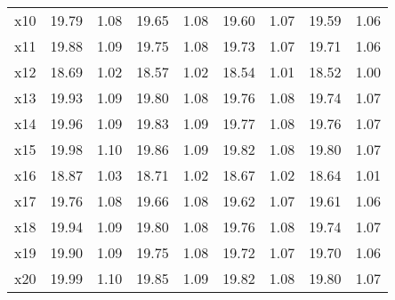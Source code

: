 \begin{tabular}{lcccccccc}
x10 & 19.79 & 1.08 & 19.65 & 1.08 & 19.60 & 1.07 & 19.59 & 1.06\\
x11 & 19.88 & 1.09 & 19.75 & 1.08 & 19.73 & 1.07 & 19.71 & 1.06\\
x12 & 18.69 & 1.02 & 18.57 & 1.02 & 18.54 & 1.01 & 18.52 & 1.00\\
x13 & 19.93 & 1.09 & 19.80 & 1.08 & 19.76 & 1.08 & 19.74 & 1.07\\
x14 & 19.96 & 1.09 & 19.83 & 1.09 & 19.77 & 1.08 & 19.76 & 1.07\\
x15 & 19.98 & 1.10 & 19.86 & 1.09 & 19.82 & 1.08 & 19.80 & 1.07\\
x16 & 18.87 & 1.03 & 18.71 & 1.02 & 18.67 & 1.02 & 18.64 & 1.01\\
x17 & 19.76 & 1.08 & 19.66 & 1.08 & 19.62 & 1.07 & 19.61 & 1.06\\
x18 & 19.94 & 1.09 & 19.80 & 1.08 & 19.76 & 1.08 & 19.74 & 1.07\\
x19 & 19.90 & 1.09 & 19.75 & 1.08 & 19.72 & 1.07 & 19.70 & 1.06\\
x20 & 19.99 & 1.10 & 19.85 & 1.09 & 19.82 & 1.08 & 19.80 & 1.07\\
\bottomrule
\end{tabular}
